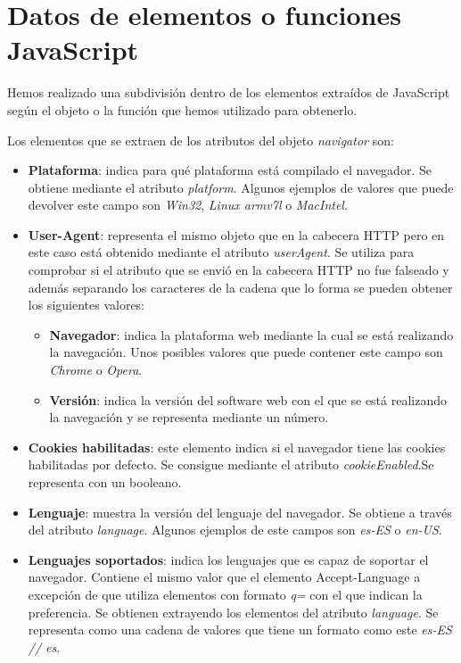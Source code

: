 \section{Datos de elementos o funciones JavaScript}
 Hemos realizado una subdivisión dentro de los elementos extraídos de JavaScript según el objeto o la función que hemos utilizado para obtenerlo.\par
\noindent Los elementos que se extraen de los atributos del objeto \textit{navigator}\cite{navigator} son:
\begin{itemize}
    \item \textbf{Plataforma}: indica para qué plataforma está compilado el navegador. Se obtiene mediante el atributo \textit{platform}. Algunos ejemplos de valores que puede devolver este campo son \textit{Win32}, \textit{Linux armv7l} o \textit{MacIntel}.
    \item \textbf{User-Agent}: representa el mismo objeto que en la cabecera HTTP pero en este caso está obtenido mediante el atributo \textit{userAgent}. Se utiliza para comprobar si el atributo que se envió en la cabecera HTTP no fue falseado y además separando los caracteres  de la cadena que lo forma se pueden obtener los siguientes valores:
    \begin{itemize}
        \item \textbf{Navegador}: indica la plataforma web mediante la cual se está realizando la navegación. Unos posibles valores que puede contener este campo son \textit{Chrome} o \textit{Opera}.
        \item \textbf{Versión}: indica la versión del software web con el que se está realizando la navegación y se representa mediante un número.
    \end{itemize}
    \item \textbf{Cookies habilitadas}: este elemento indica si el navegador tiene las cookies habilitadas por defecto. Se consigue mediante el atributo \textit{cookieEnabled}.Se representa con un booleano.
    \item \textbf{Lenguaje}: muestra la versión del lenguaje del navegador. Se obtiene a través del atributo \textit{language}. Algunos ejemplos de este campos son \textit{es-ES} o \textit{en-US}.
    \item \textbf{Lenguajes soportados}: indica los lenguajes que es capaz de soportar el navegador. Contiene el mismo valor que el elemento Accept-Language a excepción de que utiliza elementos con formato \textit{q=} con el que indican la preferencia. Se obtienen extrayendo los elementos del atributo \textit{language}. Se representa como una cadena de valores que tiene un formato como este \textit{es-ES // es}.

\end{itemize}
